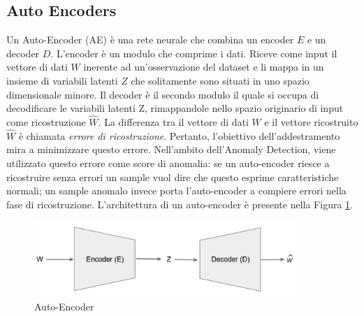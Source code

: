 \subsection{Auto Encoders}
Un Auto-Encoder (AE) \cite{aggarwal2015outlier} è una rete neurale che combina un encoder $E$ e un decoder $D$. L'encoder è un modulo che comprime i dati. Riceve come input il vettore di dati $W$ inerente ad un'osservazione del dataset e li mappa in un insieme di variabili latenti $Z$ che solitamente sono situati in uno spazio dimensionale minore. Il decoder è il secondo modulo il quale si occupa di decodificare le variabili latenti Z, rimappandole nello spazio originario di input come ricostruzione $\widehat{W}$. La differenza tra il vettore di dati $W$ e il vettore ricostruito $\widehat{W}$ è chiamata \textit{errore di ricostruzione}. Pertanto, l'obiettivo dell'addestramento mira a minimizzare questo errore. Nell'ambito dell'Anomaly Detection, viene utilizzato questo errore come score di anomalia: se un auto-encoder riesce a ricostruire senza errori un sample vuol dire che questo esprime caratteristiche normali; un sample anomalo invece porta l'auto-encoder a compiere errori nella fase di ricostruzione. L'architettura di un auto-encoder è presente nella Figura \ref{ae}.
\begin{figure}[t]
	\centering
	\includegraphics[width=10cm, scale=1]{images/ae}
	\caption{Auto-Encoder}
	\label{ae}
\end{figure}
